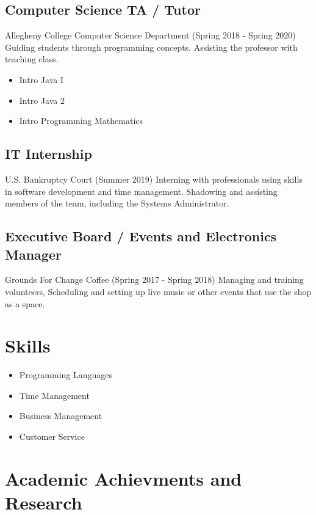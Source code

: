 \documentclass[12pt]{article}
\begin{document}
\subsection*{Computer Science TA / Tutor}
Allegheny College Computer Science Department (Spring 2018 - Spring 2020)
Guiding students through programming concepts. Assisting the professor with teaching class.

\begin{multicols}{2}
\begin{itemize}
    \item Intro Java I
    \item Intro Java 2
    \item Intro Programming Mathematics
\end{itemize}
\end{multicols}

\subsection*{IT Internship}
U.S. Bankruptcy Court (Summer 2019)
Interning with professionals using skills in software development and time management. Shadowing and assisting members of the team, including the Systems Administrator.

\subsection*{Executive Board / Events and Electronics Manager}
Grounds For Change Coffee (Spring 2017 - Spring 2018)
Managing and training volunteers, Scheduling and setting up live music or other events that use the shop as a space.


\section*{Skills}

\begin{multicols}{2}
\begin{itemize}
    \item Programming Languages
    \item Time Management
    \item Business Management
    \item Customer Service
\end{itemize}
\end{multicols}


\section*{Academic Achievments and Research}
\end{document}
